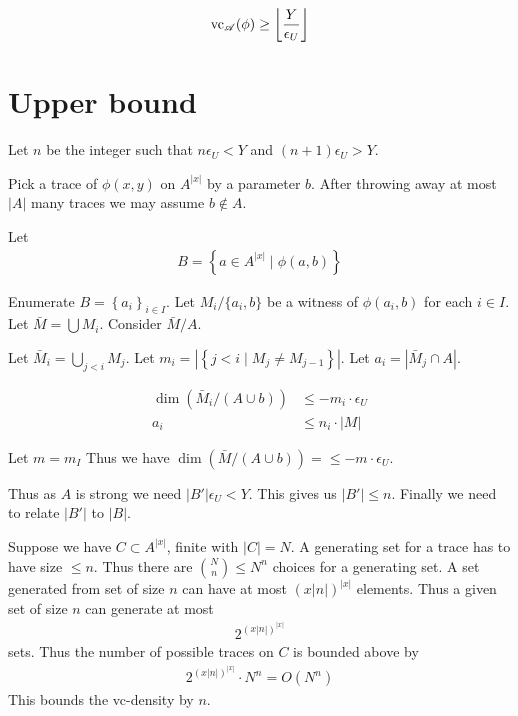 \documentclass{amsart}
\renewcommand{\AA}{\mathscr A}
\newcommand{\curly}[1]{\left\{#1\right\}}
\providecommand{\floor}[1]{\left \lfloor #1 \right \rfloor }
\begin{document}
\begin{align*}
	\vc_\AA(\phi) \geq \floor{\frac{Y}{\epsilon_U}}
\end{align*}

\section*{Upper bound}

Let $n$ be the integer such that $n \epsilon_U < Y$ and $(n+1) \epsilon_U > Y$.

Pick a trace of $\phi(x,y)$ on $A^{|x|}$ by a parameter $b$.
After throwing away at most $|A|$ many traces we may assume $b \notin A$.

Let
\begin{align*}
	B = \curly{a \in A^{|x|} \mid \phi(a, b)}
\end{align*}

Enumerate $B = \curly{a_i}_{i \in I}$.
Let $M_i / \{a_i, b\}$ be a witness of $\phi(a_i, b)$ for each $i \in I$.
Let $\bar M = \bigcup M_i$.
Consider $\bar M / A$.

Let $\bar M_i = \bigcup_{j < i} M_j$.
Let $m_i = |\curly{j < i \mid M_j \neq M_{j-1}}|$.
Let $a_i = |\bar M_j \cap A|$.

\begin{Lemma}
	\begin{align*}
		\dim(\bar M_i / (A \cup b)) &\leq -m_i \cdot \epsilon_U \\
		a_i &\leq n_i \cdot |M|
	\end{align*}
\end{Lemma}

Let $m = m_I$
Thus we have $\dim(\bar M / (A \cup b)) = \leq -m \cdot \epsilon_U $.

Thus as $A$ is strong we need $|B'| \epsilon_U < Y$.
This gives us $|B'| \leq n$.
Finally we need to relate $|B'|$ to $|B|$.

Suppose we have $C \subset A^{|x|}$, finite with $|C| = N$.
A generating set for a trace has to have size $\leq n$.
Thus there are ${N \choose n} \leq N^n$ choices for a generating set.
A set generated from set of size $n$ can have at most $(x|n|)^{|x|}$ elements.
Thus a given set of size $n$ can generate at most
\begin{align*}
	2^{(x|n|)^{|x|}}
\end{align*}
sets.
Thus the number of possible traces on $C$ is bounded above by
\begin{align*}
  2^{(x|n|)^{|x|}} \cdot N^n = O(N^n)
\end{align*}
This bounds the vc-density by $n$.
\end{document}
